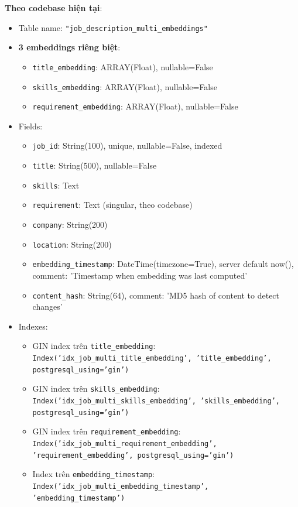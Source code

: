 \textbf{Theo codebase hiện tại}:
\begin{itemize}
    \item Table name: \texttt{"job\_description\_multi\_embeddings"}
    \item \textbf{3 embeddings riêng biệt}:
    \begin{itemize}
        \item \texttt{title\_embedding}: ARRAY(Float), nullable=False
        \item \texttt{skills\_embedding}: ARRAY(Float), nullable=False
        \item \texttt{requirement\_embedding}: ARRAY(Float), nullable=False
    \end{itemize}
    \item Fields:
    \begin{itemize}
        \item \texttt{job\_id}: String(100), unique, nullable=False, indexed
        \item \texttt{title}: String(500), nullable=False
        \item \texttt{skills}: Text
        \item \texttt{requirement}: Text (singular, theo codebase)
        \item \texttt{company}: String(200)
        \item \texttt{location}: String(200)
        \item \texttt{embedding\_timestamp}: DateTime(timezone=True), server default now(), comment: 'Timestamp when embedding was last computed'
        \item \texttt{content\_hash}: String(64), comment: 'MD5 hash of content to detect changes'
    \end{itemize}
    \item Indexes:
    \begin{itemize}
        \item GIN index trên \texttt{title\_embedding}: \texttt{Index('idx\_job\_multi\_title\_embedding', 'title\_embedding', postgresql\_using='gin')}
        \item GIN index trên \texttt{skills\_embedding}: \texttt{Index('idx\_job\_multi\_skills\_embedding', 'skills\_embedding', postgresql\_using='gin')}
        \item GIN index trên \texttt{requirement\_embedding}: \texttt{Index('idx\_job\_multi\_requirement\_embedding', 'requirement\_embedding', postgresql\_using='gin')}
        \item Index trên \texttt{embedding\_timestamp}: \texttt{Index('idx\_job\_multi\_embedding\_timestamp', 'embedding\_timestamp')}
    \end{itemize}
\end{itemize}

